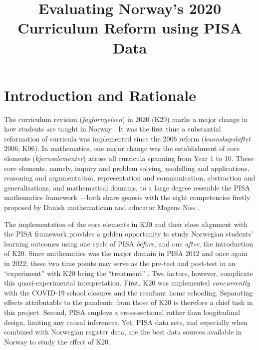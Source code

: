 \documentclass[
    a4paper,                %
    11pt,                   %
    stu,                    %
    donotrepeattitle,       %
    floatsintext,           %
    biblatex,               %
    colorlinks=true,        %
    linkcolor=red,          %
    anchorcolor=black,      %
    citecolor=blue,         %
    urlcolor=blue,          %
    bookmarks=true,         %
    bookmarksopen=false,    %
    bookmarksnumbered=true, %
    dvipsnames              %
]{apa7}
\title{Evaluating Norway's 2020 Curriculum Reform using PISA Data}
\begin{document}
\maketitle

\setcounter{page}{1}

\section{Introduction and Rationale}

The curriculum revision (\textit{fagfornyelsen}) in 2020 (K20) marks a major change in how students are taught in Norway \parencite{udir:2020}. It was the first time a substantial reformation of curricula was implemented since the 2006 reform (\textit{kunnskapsl{\o}ftet} 2006, K06). In mathematics, one major change was the establishment of core elements (\textit{kjerneelementer}) across all curricula spanning from Year 1 to 10. These core elements, namely, inquiry and problem solving, modelling and applications, reasoning and argumentation, representation and communication, abstraction and generalisations, and mathematical domains, to a large degree resemble the PISA mathematics framework \parencite{oecd:2018}---both share genesis with the eight competencies firstly proposed by Danish mathematician and educator Mogens Niss \parencite{niss:2003,niss:2011,niss:2019}.

The implementation of the core elements in K20 and their close alignment with the PISA framework provides a golden opportunity to study Norwegian students' learning outcomes using one cycle of PISA \emph{before}, and one \emph{after}, the introduction of K20. Since mathematics was the major domain in PISA 2012 and once again in 2022, these two time points may serve as the pre-test and post-test in an ``experiment'' with K20 being the ``treatment'' \parencite{shadish:2002}. Two factors, however, complicate this quasi-experimental interpretation. First, K20 was implemented \emph{concurrently} with the COVID-19 school closures and the resultant home schooling. Separating effects attributable to the pandemic from those of K20 is therefore a chief task in this project. Second, PISA employs a cross-sectional rather than longitudinal design, limiting any causal inferences. Yet, PISA data sets, and especially when combined with Norwegian register data, are the best data sources available in Norway to study the effect of K20.
\end{document}
